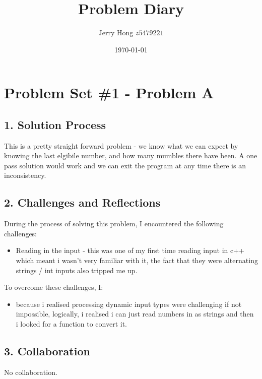 \documentclass[a4paper,12pt]{article}
\title{Problem Diary}
\author{Jerry Hong $z5479221$}
\date{\today}
\begin{document}
\maketitle

\section*{Problem Set \#1 - Problem A}

\subsection*{1. Solution Process}
This is a pretty straight forward problem - we know what we can expect by knowing the last elgibile number, and how many mumbles there have been. A one pass solution would work and we can exit the program at any time there is an inconsistency.

\subsection*{2. Challenges and Reflections}
During the process of solving this problem, I encountered the following challenges:
\begin{itemize}
    \item Reading in the input - this was one of my first time reading input in c++ which meant i wasn't very familiar with it, the fact that they were alternating strings / int inputs also tripped me up.
\end{itemize}

To overcome these challenges, I:
\begin{itemize}
    \item because i realised processing dynamic input types were challenging if not impossible, logically, i realised i can just read numbers in as strings and then i looked for a function to convert it.
\end{itemize}

\subsection*{3. Collaboration}
No collaboration.
\end{document}
